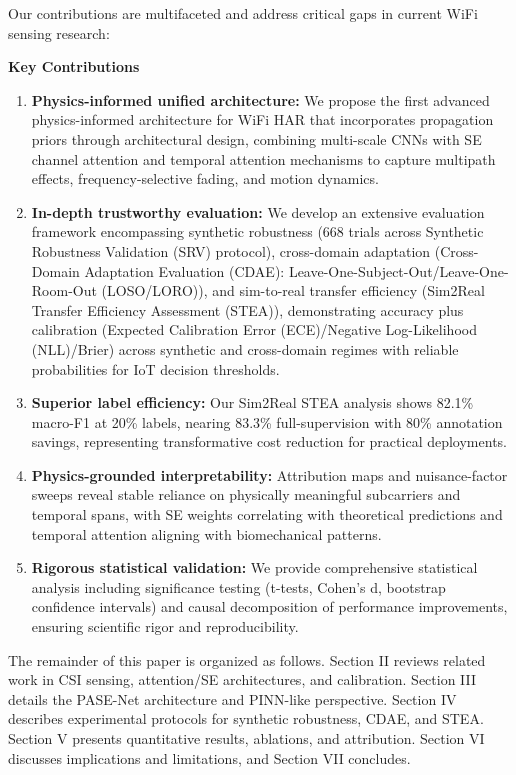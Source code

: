 \documentclass[lettersize,journal]{IEEEtran}
\begin{document}
Our contributions are multifaceted and address critical gaps in current WiFi sensing research:

\textbf{Key Contributions}
\begin{enumerate}
  \item \textbf{Physics-informed unified architecture:} We propose the first advanced physics-informed architecture for WiFi HAR that incorporates propagation priors through architectural design, combining multi-scale CNNs with SE channel attention and temporal attention mechanisms to capture multipath effects, frequency-selective fading, and motion dynamics.
  \item \textbf{In-depth trustworthy evaluation:} We develop an extensive evaluation framework encompassing synthetic robustness (668 trials across Synthetic Robustness Validation (SRV) protocol), cross-domain adaptation (Cross-Domain Adaptation Evaluation (CDAE): Leave-One-Subject-Out/Leave-One-Room-Out (LOSO/LORO)), and sim-to-real transfer efficiency (Sim2Real Transfer Efficiency Assessment (STEA)), demonstrating accuracy plus calibration (Expected Calibration Error (ECE)/Negative Log-Likelihood (NLL)/Brier) across synthetic and cross-domain regimes with reliable probabilities for IoT decision thresholds.
  \item \textbf{Superior label efficiency:} Our Sim2Real STEA analysis shows 82.1\% macro-F1 at 20\% labels, nearing 83.3\% full-supervision with 80\% annotation savings, representing transformative cost reduction for practical deployments.
  \item \textbf{Physics-grounded interpretability:} Attribution maps and nuisance-factor sweeps reveal stable reliance on physically meaningful subcarriers and temporal spans, with SE weights correlating with theoretical predictions and temporal attention aligning with biomechanical patterns.
  \item \textbf{Rigorous statistical validation:} We provide comprehensive statistical analysis including significance testing (t-tests, Cohen's d, bootstrap confidence intervals) and causal decomposition of performance improvements, ensuring scientific rigor and reproducibility.
\end{enumerate}

The remainder of this paper is organized as follows. Section II reviews related work in CSI sensing, attention/SE architectures, and calibration. Section III details the PASE-Net architecture and PINN-like perspective. Section IV describes experimental protocols for synthetic robustness, CDAE, and STEA. Section V presents quantitative results, ablations, and attribution. Section VI discusses implications and limitations, and Section VII concludes.
\end{document}
